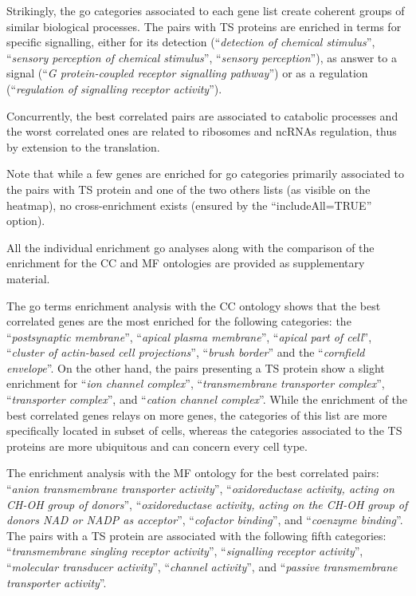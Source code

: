 Strikingly, the \gls{go} categories associated to each gene list create
coherent groups of similar biological processes.
The pairs with \gls{TS} proteins are enriched in terms for specific signalling,
either for its detection (\enquote{\textit{detection of chemical stimulus}},
\enquote{\textit{sensory perception of chemical stimulus}},
\enquote{\textit{sensory perception}}),
as answer to a signal (\enquote{\textit{G protein-coupled receptor signalling pathway}})
or as a regulation (\enquote{\textit{regulation of signalling receptor activity}}).

Concurrently, the best correlated pairs are associated to catabolic processes
and the worst correlated ones are related to
ribosomes and \glspl{ncRNA} regulation,
thus by extension to the translation.

Note that while a few genes are enriched for \gls{go} categories primarily
associated to the pairs with \gls{TS} protein and one of the two others lists
(as visible on the heatmap),
no cross-enrichment exists
(ensured by the \enquote{\textsf{includeAll=TRUE}} option).\\
\vspace{-\baselineskip}

All the individual enrichment \gls{go} analyses
along with the comparison of the enrichment for the CC and MF ontologies
are provided as supplementary material.

The \gls{go} terms enrichment analysis with the CC ontology shows
that the best correlated genes are the most enriched
for the following categories:
the \enquote{\textit{postsynaptic membrane}},
\enquote{\textit{apical plasma membrane}},
\enquote{\textit{apical part of cell}},
\enquote{\textit{cluster of actin-based cell projections}},
\enquote{\textit{brush border}}
and the \enquote{\textit{cornfield envelope}}.
On the other hand, the pairs presenting a \gls{TS} protein show a slight enrichment
for \enquote{\textit{ion channel complex}},
\enquote{\textit{transmembrane transporter complex}},
\enquote{\textit{transporter complex}},
and \enquote{\textit{cation channel complex}}.
While the enrichment of the best correlated genes relays on more genes,
the categories of this list are more specifically located in subset of cells,
whereas the categories associated to the \gls{TS} proteins
are more ubiquitous and can concern every cell type.

The enrichment analysis with the MF ontology
for the best correlated pairs:
\enquote{\textit{anion transmembrane transporter activity}},
\enquote{\textit{oxidoreductase activity, acting on CH-OH group of donors}},
\enquote{\textit{oxidoreductase activity, acting on the CH-OH group of donors
NAD or NADP as acceptor}},
\enquote{\textit{cofactor binding}},
and \enquote{\textit{coenzyme binding}}.
The pairs with a \gls{TS} protein are associated with the following fifth categories:
\enquote{\textit{transmembrane singling receptor activity}},
\enquote{\textit{signalling receptor activity}},
\enquote{\textit{molecular transducer activity}},
\enquote{\textit{channel activity}},
and \enquote{\textit{passive transmembrane transporter activity}}.


